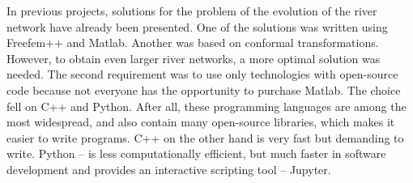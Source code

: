 \documentclass[]{pracamgr}
\begin{document}
    In previous projects, solutions for the problem of the evolution of the river network have already been presented. One of the solutions was written using Freefem++ and Matlab. Another was based on conformal transformations. However, to obtain even larger river networks, a more optimal solution was needed. The second requirement was to use only technologies with open-source code because not everyone has the opportunity to purchase Matlab. The choice fell on C++\cite{Stroustrup1997} and Python. After all, these programming languages are among the most widespread, and also contain many open-source libraries, which makes it easier to write programs. C++ on the other hand is very fast but demanding to write. Python\cite{python3} -- is less computationally efficient, but much faster in software development and provides an interactive scripting tool -- Jupyter.
\end{document}
